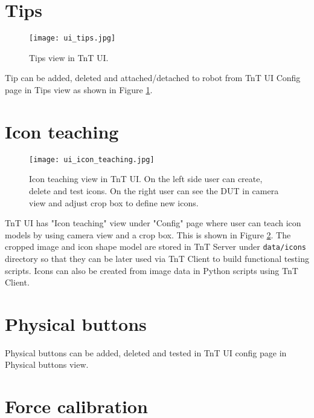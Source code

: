 \section{Tips}

\begin{figure}[h]
	\centering
	\texttt{[image: ui\_tips.jpg]}
	\caption{Tips view in TnT UI.}
	\label{fig:ui_tips}
\end{figure}

Tip can be added, deleted and attached/detached to robot from TnT UI Config page in Tips view as shown in Figure \ref{fig:ui_tips}.



\section{Icon teaching}
\label{sec:ui_icon_teaching}

\begin{figure}[!h]
	\centering
	\texttt{[image: ui\_icon\_teaching.jpg]}
	\caption{Icon teaching view in TnT UI. On the left side user can create, delete and test icons. On the right user can see the DUT in camera view and adjust crop box to define new icons.}
	\label{fig:ui_icon_teaching}
\end{figure}

TnT UI has "Icon teaching" view under "Config" page where user can teach icon models by using camera view and a crop box. This is shown in Figure \ref{fig:ui_icon_teaching}. The cropped image and icon shape model are stored in TnT Server under \texttt{data/icons} directory so that they can be later used via TnT Client to build functional testing scripts. Icons can also be created from image data in Python scripts using TnT Client.



\section{Physical buttons}

Physical buttons can be added, deleted and tested in TnT UI config page in Physical buttons view.



\section{Force calibration}
\label{sec:force_calibration}


